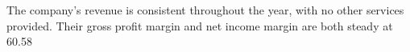 

The company's revenue is consistent throughout the year, with no other services provided. Their gross profit margin and net income margin are both steady at 60.58%